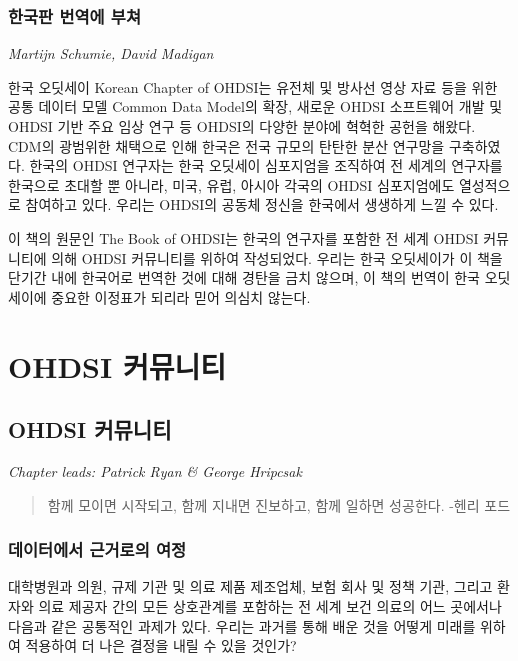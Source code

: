 \documentclass[10.5pt]{book}
\theoremstyle{definition}
\theoremstyle{definition}
\theoremstyle{definition}
\theoremstyle{remark}
\begin{document}
\section*{한국판 번역에 부쳐}\label{--}

\emph{Martijn Schumie, David Madigan}

한국 오딧세이 Korean Chapter of OHDSI는 유전체 및 방사선 영상 자료 등을
위한 공통 데이터 모델 Common Data Model의 확장, 새로운 OHDSI 소프트웨어
개발 및 OHDSI 기반 주요 임상 연구 등 OHDSI의 다양한 분야에 혁혁한 공헌을
해왔다. CDM의 광범위한 채택으로 인해 한국은 전국 규모의 탄탄한 분산
연구망을 구축하였다. 한국의 OHDSI 연구자는 한국 오딧세이 심포지엄을
조직하여 전 세계의 연구자를 한국으로 초대할 뿐 아니라, 미국, 유럽,
아시아 각국의 OHDSI 심포지엄에도 열성적으로 참여하고 있다. 우리는
OHDSI의 공동체 정신을 한국에서 생생하게 느낄 수 있다.

이 책의 원문인 The Book of OHDSI는 한국의 연구자를 포함한 전 세계 OHDSI
커뮤니티에 의해 OHDSI 커뮤니티를 위하여 작성되었다. 우리는 한국
오딧세이가 이 책을 단기간 내에 한국어로 번역한 것에 대해 경탄을 금치
않으며, 이 책의 번역이 한국 오딧세이에 중요한 이정표가 되리라 믿어
의심치 않는다.

\mainmatter

\part{OHDSI 커뮤니티}\label{part-ohdsi-}

\chapter{OHDSI 커뮤니티}\label{OhdsiCommunity}

\emph{Chapter leads: Patrick Ryan \& George Hripcsak}

\begin{quote}
함께 모이면 시작되고, 함께 지내면 진보하고, 함께 일하면 성공한다. -헨리
포드
\end{quote}

\section{데이터에서 근거로의 여정}\label{--}

대학병원과 의원, 규제 기관 및 의료 제품 제조업체, 보험 회사 및 정책
기관, 그리고 환자와 의료 제공자 간의 모든 상호관계를 포함하는 전 세계
보건 의료의 어느 곳에서나 다음과 같은 공통적인 과제가 있다. 우리는
과거를 통해 배운 것을 어떻게 미래를 위하여 적용하여 더 나은 결정을 내릴
수 있을 것인가?
\end{document}
